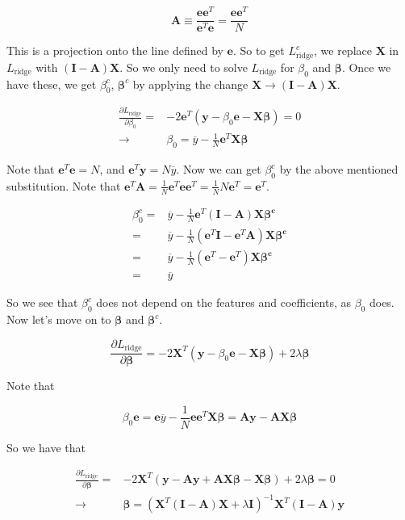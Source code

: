 \documentclass{article}
\begin{document}
\[
    \mathbf{A} \equiv \frac{\mathbf{e}\mathbf{e}^T}{\mathbf{e}^T\mathbf{e}} = \frac{\mathbf{e}\mathbf{e}^T}{N}
\]

This is a projection onto the line defined by $\mathbf{e}$. So to get $L^c_{\text{ridge}}$, we replace $\mathbf{X}$ in $L_{\text{ridge}}$ with $(\mathbf{I} - \mathbf{A})\mathbf{X}$. So we only need to solve $L_{\text{ridge}}$ for $\beta_0$ and $\bm{\beta}$. Once we have these, we get $\beta^c_0$, $\bm{\beta}^c$ by applying the change $\mathbf{X} \to (\mathbf{I} - \mathbf{A})\mathbf{X}$.

\[
\begin{split}
\frac{\partial L_{\text{ridge}}}{\partial \beta_0} =& -2\mathbf{e}^T(\mathbf{y} - \beta_0 \mathbf{e} - \mathbf{X}\bm{\beta}) = 0\\
\to & \beta_0 = \overline{y} - \frac{1}{N}\mathbf{e}^T \mathbf{X} \bm{\beta}
\end{split}
\]

Note that $\mathbf{e}^T\mathbf{e} = N$, and $\mathbf{e}^T \mathbf{y} = N \overline{y}$. Now we can get $\beta^c_0$ by the above mentioned substitution. Note that $\mathbf{e}^T\mathbf{A} = \frac1N \mathbf{e}^T\mathbf{e}\mathbf{e}^T = \frac1N N\mathbf{e}^T = \mathbf{e}^T$.

\[
\begin{split}
\beta^c_0 =& \overline{y} - \frac1N \mathbf{e}^T (\mathbf{I} - \mathbf{A})\mathbf{X}\bm{\beta^c}\\
=& \overline{y} - \frac1N (\mathbf{e}^T\mathbf{I} - \mathbf{e}^T\mathbf{A})\mathbf{X}\bm{\beta^c}\\
=& \overline{y} - \frac1N (\mathbf{e}^T - \mathbf{e}^T)\mathbf{X}\bm{\beta^c}\\
=& \overline{y}
\end{split}
\]

So we see that $\beta^c_0$ does not depend on the features and coefficients, as $\beta_0$ does. Now let's move on to $\bm{\beta}$ and $\bm{\beta}^c$.

\[
\frac{\partial L_{\text{ridge}}}{\partial \bm{\beta}} = -2\mathbf{X}^T (\mathbf{y} - \beta_0 \mathbf{e} - \mathbf{X}\bm{\beta}) + 2\lambda \bm{\beta}
\]

Note that

\[
\beta_0 \mathbf{e} = \mathbf{e} \overline{y} - \frac1N \mathbf{e} \mathbf{e}^T \mathbf{X} \bm{\beta} = \mathbf{A}\mathbf{y} - \mathbf{A}\mathbf{X}\bm{\beta}
\]

So we have that

\[
\begin{split}
\frac{\partial L_{\text{ridge}}}{\partial \bm{\beta}} =& -2\mathbf{X}^T (\mathbf{y} - \mathbf{A}\mathbf{y} + \mathbf{A}\mathbf{X}\bm{\beta} - \mathbf{X}\bm{\beta}) + 2\lambda \bm{\beta} = 0\\
\to& \bm{\beta} = (\mathbf{X}^T(\mathbf{I} - \mathbf{A})\mathbf{X} + \lambda \mathbf{I})^{-1} \mathbf{X}^T (\mathbf{I} - \mathbf{A})\mathbf{y}
\end{split}
\]
\end{document}
